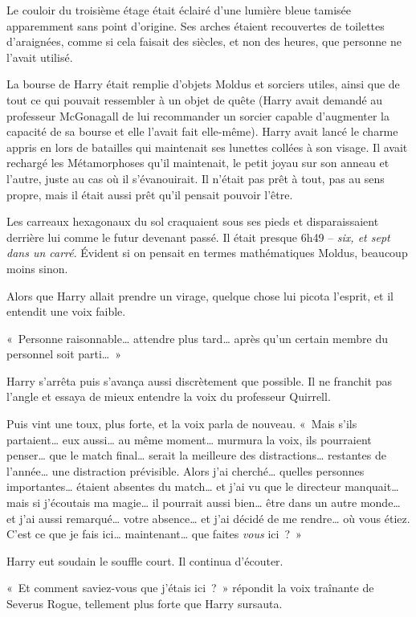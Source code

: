 Le couloir du troisième étage était éclairé d'une lumière bleue tamisée apparemment sans point d'origine. Ses arches étaient recouvertes de toilettes d'araignées, comme si cela faisait des siècles, et non des heures, que personne ne l'avait utilisé.

La bourse de Harry était remplie d'objets Moldus et sorciers utiles, ainsi que de tout ce qui pouvait ressembler à un objet de quête (Harry avait demandé au professeur McGonagall de lui recommander un sorcier capable d'augmenter la capacité de sa bourse et elle l'avait fait elle-même). Harry avait lancé le charme appris en lors de batailles qui maintenait ses lunettes collées à son visage. Il avait rechargé les Métamorphoses qu'il maintenait, le petit joyau sur son anneau et l'autre, juste au cas où il s'évanouirait. Il n'était pas prêt à tout, pas au sens propre, mais il était aussi prêt qu'il pensait pouvoir l'être.

Les carreaux hexagonaux du sol craquaient sous ses pieds et disparaissaient derrière lui comme le futur devenant passé. Il était presque 6h49 -- \emph{six, et sept dans un carré}. Évident si on pensait en termes mathématiques Moldus, beaucoup moins sinon.

Alors que Harry allait prendre un virage, quelque chose lui picota l'esprit, et il entendit une voix faible.

«~Personne raisonnable… attendre plus tard… après qu'un certain membre du personnel soit parti…~»

Harry s'arrêta puis s'avança aussi discrètement que possible. Il ne franchit pas l'angle et essaya de mieux entendre la voix du professeur Quirrell.

Puis vint une toux, plus forte, et la voix parla de nouveau. «~Mais s'ils partaient… eux aussi… au même moment… murmura la voix, ils pourraient penser… que le match final… serait la meilleure des distractions… restantes de l'année… une distraction prévisible. Alors j'ai cherché… quelles personnes importantes… étaient absentes du match… et j'ai vu que le directeur manquait… mais si j'écoutais ma magie… il pourrait aussi bien… être dans un autre monde… et j'ai aussi remarqué… votre absence… et j'ai décidé de me rendre… où vous étiez. C'est ce que je fais ici… maintenant… que faites \emph{vous} ici~?~»

Harry eut soudain le souffle court. Il continua d'écouter.

«~Et comment saviez-vous que j'étais ici~?~» répondit la voix traînante de Severus Rogue, tellement plus forte que Harry sursauta.

